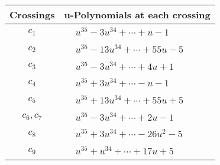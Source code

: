 \documentclass[1p]{elsarticle_modified}
\theoremstyle{definition}
\begin{document}
\begin{tabular}{m{50pt}|m{274pt}}
Crossings & \hspace{64pt}u-Polynomials at each crossing \\
\hline $$\begin{aligned}c_{1}\end{aligned}$$&$\begin{aligned}
&u^{35}-3 u^{34}+\cdots+u-1
\end{aligned}$\\
\hline $$\begin{aligned}c_{2}\end{aligned}$$&$\begin{aligned}
&u^{35}-13 u^{34}+\cdots+55 u-5
\end{aligned}$\\
\hline $$\begin{aligned}c_{3}\end{aligned}$$&$\begin{aligned}
&u^{35}-3 u^{34}+\cdots+4 u+1
\end{aligned}$\\
\hline $$\begin{aligned}c_{4}\end{aligned}$$&$\begin{aligned}
&u^{35}+3 u^{34}+\cdots- u-1
\end{aligned}$\\
\hline $$\begin{aligned}c_{5}\end{aligned}$$&$\begin{aligned}
&u^{35}+13 u^{34}+\cdots+55 u+5
\end{aligned}$\\
\hline $$\begin{aligned}c_{6},c_{7}\end{aligned}$$&$\begin{aligned}
&u^{35}-3 u^{34}+\cdots+2 u-1
\end{aligned}$\\
\hline $$\begin{aligned}c_{8}\end{aligned}$$&$\begin{aligned}
&u^{35}+3 u^{34}+\cdots-26 u^2-5
\end{aligned}$\\
\hline $$\begin{aligned}c_{9}\end{aligned}$$&$\begin{aligned}
&u^{35}+u^{34}+\cdots+17 u+5
\end{aligned}$\\

\end{tabular}
\end{document}
